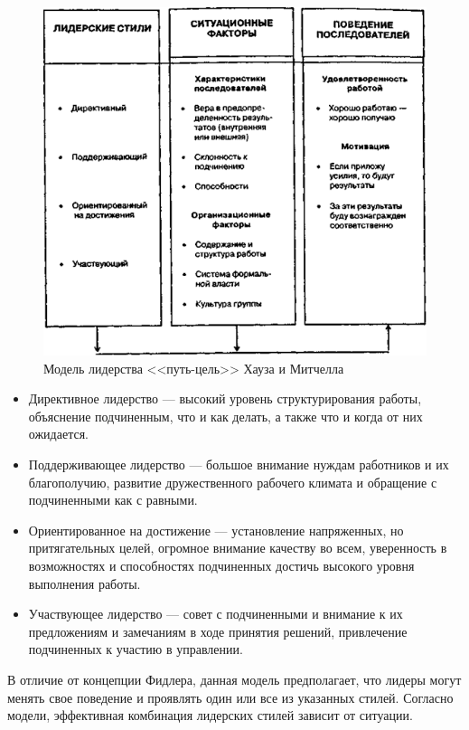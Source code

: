 \documentclass[a4paper,12pt,oneside,final]{extarticle}
\makeatletter
\numberwithin{equation}{section}
\def\maxwidth#1{\ifdim\Gin@nat@width>#1 #1\else\Gin@nat@width\fi}
\makeatother
\begin{document}
\begin{figure}[h]
	\centering
	\includegraphics[width=\maxwidth{\textwidth}]{management-figures/leadership_wg}
	\caption{Модель лидерства <<путь-цель>> Хауза и Митчелла}
\end{figure}
\begin{itemize}
	\item Директивное лидерство --- высокий уровень структурирования работы, объяснение подчиненным, что и как делать, а также что и когда от них ожидается.
	\item Поддерживающее лидерство --- большое внимание нуждам работников и их благополучию, развитие дружественного рабочего климата и обращение с подчиненными как с равными.
	\item Ориентированное на достижение --- установление напряженных, но притягательных целей, огромное внимание качеству во всем, уверенность в возможностях и способностях подчиненных достичь высокого уровня выполнения работы.
	\item Участвующее лидерство --- совет с подчиненными и внимание к их предложениям и замечаниям в ходе принятия решений, привлечение подчиненных к участию в управлении.
\end{itemize}	

В отличие от концепции Фидлера, данная модель предполагает, что лидеры могут менять свое поведение и проявлять один или все из указанных стилей. 
Согласно модели, эффективная комбинация лидерских стилей зависит от ситуации.
\end{document}
